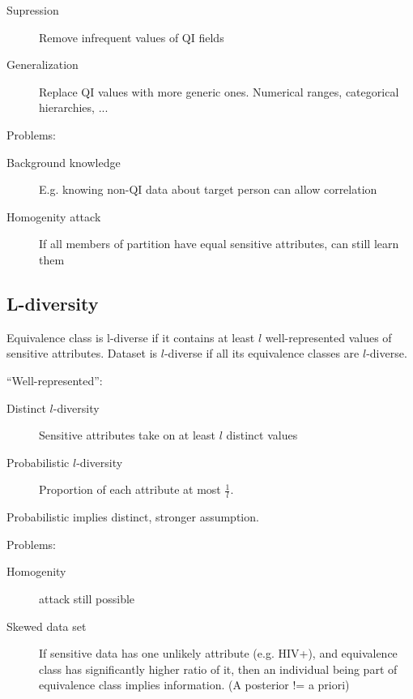 \documentclass[a4paper]{scrreprt}
\begin{document}
\begin{description}
		\item[Supression] Remove infrequent values of QI fields
		\item[Generalization] Replace QI values with more generic ones. Numerical ranges, categorical hierarchies, ...
\end{description}

Problems:
\begin{description}
		\item[Background knowledge] E.g. knowing non-QI data about target person can allow correlation
		\item[Homogenity attack] If all members of partition have equal sensitive attributes, can still learn them
\end{description}

\subsection{L-diversity}

Equivalence class is l-diverse if it contains at least $l$ well-represented
values of sensitive attributes. Dataset is $l$-diverse if all its equivalence
classes are $l$-diverse.

``Well-represented'':
\begin{description}
		\item[Distinct $l$-diversity] Sensitive attributes take on at least $l$ distinct values
		\item[Probabilistic $l$-diversity] Proportion of each attribute at most $\frac{1}{l}$.
\end{description}

Probabilistic implies distinct, stronger assumption.

Problems:
\begin{description}
		\item[Homogenity] attack still possible
		\item[Skewed data set] If sensitive data has one unlikely attribute
				(e.g. HIV+), and equivalence class has significantly higher
				ratio of it, then an individual being part of equivalence class
				implies information. (A posterior != a priori)
\end{description}

\printbibliography
\end{document}
